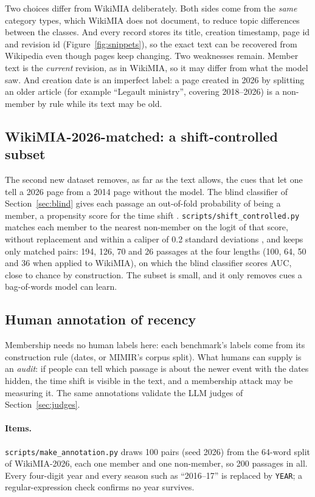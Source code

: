 \documentclass[11pt]{article}
\begin{document}
Two choices differ from WikiMIA deliberately. Both sides come from the \emph{same} category types, which WikiMIA does not document, to reduce topic differences between the classes. And every record stores its title, creation timestamp, page id and revision id (Figure~\ref{fig:snippets}), so the exact text can be recovered from Wikipedia even though pages keep changing. Two weaknesses remain. Member text is the \emph{current} revision, as in WikiMIA, so it may differ from what the model saw. And creation date is an imperfect label: a page created in 2026 by splitting an older article (for example ``Legault ministry'', covering 2018--2026) is a non-member by rule while its text may be old.

\subsection{WikiMIA-2026-matched: a shift-controlled subset}
\label{sec:matched}

The second new dataset removes, as far as the text allows, the cues that let one tell a 2026 page from a 2014 page without the model. The blind classifier of Section~\ref{sec:blind} gives each passage an out-of-fold probability of being a member, a propensity score for the time shift \citep{rosenbaum1983central}. \texttt{scripts/shift\_controlled.py} matches each member to the nearest non-member on the logit of that score, without replacement and within a caliper of 0.2 standard deviations \citep{austin2011optimal}, and keeps only matched pairs: 194, 126, 70 and 26 passages at the four lengths (100, 64, 50 and 36 when applied to WikiMIA), on which the blind classifier scores \ShiftBlindRange{} AUC, close to chance by construction. The subset is small, and it only removes cues a bag-of-words model can learn.

\subsection{Human annotation of recency}
\label{sec:annotation}

Membership needs no human labels here: each benchmark's labels come from its construction rule (dates, or MIMIR's corpus split). What humans can supply is an \emph{audit}: if people can tell which passage is about the newer event with the dates hidden, the time shift is visible in the text, and a membership attack may be measuring it. The same annotations validate the LLM judges of Section~\ref{sec:judges}.

\paragraph{Items.} \texttt{scripts/make\_annotation.py} draws 100 pairs (seed 2026) from the 64-word split of WikiMIA-2026, each one member and one non-member, so 200 passages in all. Every four-digit year and every season such as ``2016--17'' is replaced by \texttt{YEAR}; a regular-expression check confirms no year survives.
\end{document}
